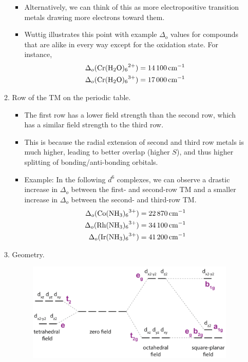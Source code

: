 \documentclass[../notes.tex]{subfiles}
\begin{document}
\begin{itemize}
\begin{enumerate}
\begin{itemize}
            \item Alternatively, we can think of this as more electropositive transition metals drawing more electrons toward them.
            \item Wuttig illustrates this point with example $\Delta_o$ values for compounds that are alike in every way except for the oxidation state. For instance,
            \begin{align*}
                \Delta_o(\ce{Cr(H2O)6^2+}) &= \SI{14100}{\per\centi\meter}\\
                \Delta_o(\ce{Cr(H2O)6^3+}) &= \SI{17000}{\per\centi\meter}
            \end{align*}
        \end{itemize}
        \item Row of the TM on the periodic table.
        \begin{itemize}
            \item The first row has a lower field strength than the second row, which has a similar field strength to the third row.
            \item This is because the radial extension of second and third row metals is much higher, leading to better overlap (higher $S$), and thus higher splitting of bonding/anti-bonding orbitals.
            \item Example: In the following $d^6$ complexes, we can observe a drastic increase in $\Delta_o$ between the first- and second-row TM and a smaller increase in $\Delta_o$ between the second- and third-row TM.
            \begin{align*}
                \Delta_o(\ce{Co(NH3)6^3+}) &= \SI{22870}{\per\centi\meter}\\
                \Delta_o(\ce{Rh(NH3)6^3+}) &= \SI{34100}{\per\centi\meter}\\
                \Delta_o(\ce{Ir(NH3)6^3+}) &= \SI{41200}{\per\centi\meter}
            \end{align*}
        \end{itemize}
        \item Geometry.
        \begin{figure}[h!]
            \centering
            \includegraphics[width=0.5\linewidth]{../ExtFiles/geometryFieldStrength.png}

\end{figure}
\end{enumerate}
\end{itemize}
\end{document}
